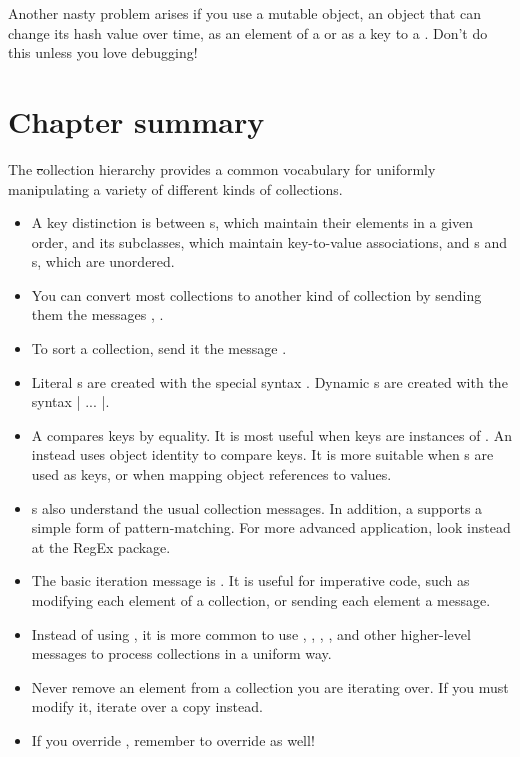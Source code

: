 \documentclass[a4paper,10pt,twoside]{book}
\begin{document}
Another nasty problem arises if you use a mutable object, \ie an object that can change its hash value over time, as an element of a  or as a key to a .
Don't do this unless you love debugging!

\section{Chapter summary}

The \st collection hierarchy provides a common vocabulary for uniformly manipulating a variety of different kinds of collections.

\begin{itemize}
  \item A key distinction is between s, which maintain their elements in a given order,  and its subclasses, which maintain key-to-value associations, and s and s, which are unordered.
  \item You can convert most collections to another kind of collection by sending them the messages ,  \etc.
  \item To sort a collection, send it the message .
  \item Literal s are created with the special syntax .  Dynamic s are created with the syntax \ct|{ ... }|.
  \item A  compares keys by equality. It is most useful when keys are instances of . An  instead uses object identity to compare keys.  It is more suitable when s are used as keys, or when mapping object references to values.
  \item {}s also understand the usual collection messages.  In addition, a  supports a simple form of pattern-matching. For more advanced application, look instead at the RegEx package.
  \item The basic iteration message is . It is useful for imperative code, such as modifying each element of a collection, or sending each element a message.
  \item Instead of using , it is more common to use , , , ,  and other higher-level messages to process collections in a uniform way.
  \item Never remove an element from a collection you are iterating over. If you must modify it, iterate over a copy instead.
  \item If you override \ct{=}, remember to override  as well!
\end{itemize}

\ifx\wholebook\relax\else
   
   
\end{document}
